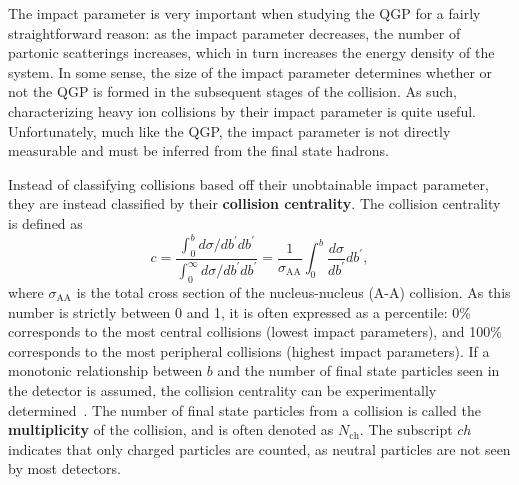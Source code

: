 The impact parameter is very important when studying the QGP for a fairly straightforward reason: as the impact parameter decreases, the number of partonic scatterings increases, which in turn increases the energy density of the system. In some sense, the size of the impact parameter determines whether or not the QGP is formed in the subsequent stages of the collision. As such, characterizing heavy ion collisions by their impact parameter is quite useful.  Unfortunately, much like the QGP, the impact parameter is not directly measurable and must be inferred from the final state hadrons.

Instead of classifying collisions based off their unobtainable impact parameter, they are instead classified by their \textbf{collision centrality}. The collision centrality is defined as
%
\begin{equation}
    \label{eq:centrality}
    c=\frac{\int_0^b d \sigma / d b^{\prime} d b^{\prime}}{\int_0^{\infty} d \sigma / d b^{\prime} d b^{\prime}}=\frac{1}{\sigma_{\mathrm{AA}}} \int_0^b \frac{d \sigma}{d b^{\prime}} d b^{\prime},
\end{equation}
%
where $\sigma_{\mathrm{AA}}$ is the total cross section of the nucleus-nucleus (A-A) collision. As this number is strictly between 0 and 1, it is often expressed as a percentile: 0\% corresponds to the most central collisions (lowest impact parameters), and 100\% corresponds to the most peripheral collisions (highest impact parameters). If a monotonic relationship between $b$ and the number of final state particles seen in the detector is assumed, the collision centrality can be experimentally determined~\cite{GlauberModelALICE1}. The number of final state particles from a collision is called the \textbf{multiplicity} of the collision, and is often denoted as $N_\text{ch}$. The subscript $ch$ indicates that only charged particles are counted, as neutral particles are not seen by most detectors. 

